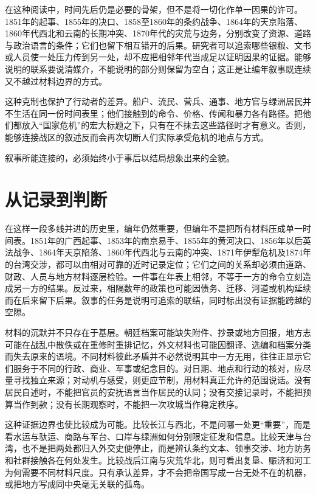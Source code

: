 在这种阅读中，时间先后仍是必要的骨架，但不是将一切化作单一因果的许可。1851年的起事、1855年的决口、1858至1860年的条约战争、1864年的天京陷落、1860年代西北和云南的长期冲突、1870年代的灾荒与边务，分别改变了资源、道路与政治语言的条件；它们也留下相互错开的后果。研究者可以追索哪些银粮、文书或人员使一处压力传到另一处，却不应把相邻年代当成足以证明因果的证据。能够说明的联系要说清媒介，不能说明的部分则保留为空白；这正是让编年叙事既连续又不越过材料边界的方式。

这种克制也保护了行动者的差异。船户、流民、营兵、通事、地方官与绿洲居民并不生活在同一份时间表里；他们接触到的命令、价格、传闻和暴力各有路径。把他们都放入“国家危机”的宏大标题之下，只有在不抹去这些路径时才有意义。否则，能够连接战区的叙述反而会再次切断人们实际承受危机的地点与方式。

叙事所能连接的，必须始终小于事后以结局想象出来的全貌。

\section{从记录到判断}

在这样一段多线并进的历史里，编年仍然重要，但编年不是把所有材料压成单一时间表。1851年的广西起事、1853年的南京易手、1855年的黄河决口、1856年以后英法战争、1864年天京陷落、1860年代西北与云南的冲突、1871年伊犁危机及1874年的台湾交涉，都可以由相对可靠的近时记录定位；它们之间的关系却必须由道路、财政、人员与地方材料逐层检验。一件事在年表上相邻，不等于一方的命令立刻造成另一方的结果。反过来，相隔数年的政策也可能因债务、迁移、河道或机构延续而在后来留下后果。叙事的任务是说明可追索的联结，同时标出没有证据能跨越的空隙。

材料的沉默并不只存在于基层。朝廷档案可能缺失附件、抄录或地方回报，地方志可能在战乱中散佚或在重修时重排记忆，外文材料也可能因翻译、选编和档案分类而失去原来的语境。不同材料彼此矛盾并不必然说明其中一方无用，往往正显示它们服务于不同的行政、商业、军事或纪念目的。对日期、地点和行动的核对，应尽量寻找独立来源；对动机与感受，则更应节制，用材料真正允许的范围说话。没有居民自述时，不能把官员的安抚语言当作居民的认同；没有交接记录时，不能把预算当作到款；没有长期观察时，不能把一次攻城当作稳定秩序。

这种证据边界也使比较成为可能。比较长江与西北，不是问哪一处更“重要”，而是看水运与驮运、商路与军台、口岸与绿洲如何分别限定征发和信息。比较天津与台湾，也不是把两处都归入外交史便停止，而是辨认条约文本、领事交涉、地方防务和社群接触各在何处发生。比较战后江南与灾荒华北，则可看出复垦、赈济和河工为何需要不同材料尺度。只有承认差异，才不会把帝国写成一台无处不在的机器，或把地方写成同中央毫无关联的孤岛。

